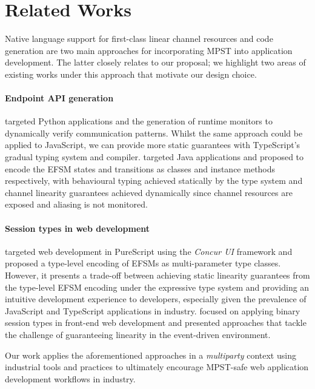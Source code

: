 \section{Related Works}

Native language support for first-class linear channel resources \cite{ATS} and
code generation are two main approaches for incorporating MPST into application
development.
The latter closely relates to our proposal;
we highlight two areas of existing works under this approach that motivate our
design choice.

\paragraph{Endpoint API generation}
\cite{Python2017} targeted Python applications and the generation of runtime
monitors to dynamically verify communication patterns.
Whilst the same approach could be applied to JavaScript, we can provide more
static guarantees with TypeScript's gradual typing system and compiler.
\cite{Hybrid2016} targeted Java applications and proposed to encode the EFSM
states and transitions as classes and instance methods respectively, with
behavioural typing achieved statically by the type system and channel linearity
guarantees achieved dynamically since channel resources are exposed and
aliasing is not monitored.

\paragraph{Session types in web development}
\cite{PureScript2019} targeted web development in PureScript using the
\textit{Concur UI} framework and proposed a type-level encoding of EFSMs as
multi-parameter type classes.
However, it presents a trade-off between achieving static linearity guarantees
from the type-level EFSM encoding under the expressive type system and
providing an intuitive development experience to developers, especially given
the prevalence of JavaScript and TypeScript applications in industry.
\cite{MVU2019} focused on applying binary session types in front-end web
development and presented approaches that tackle the challenge of guaranteeing
linearity in the event-driven environment.

Our work applies the aforementioned approaches in a \textit{multiparty} context
using industrial tools and practices to ultimately encourage MPST-safe web
application development workflows in industry.


